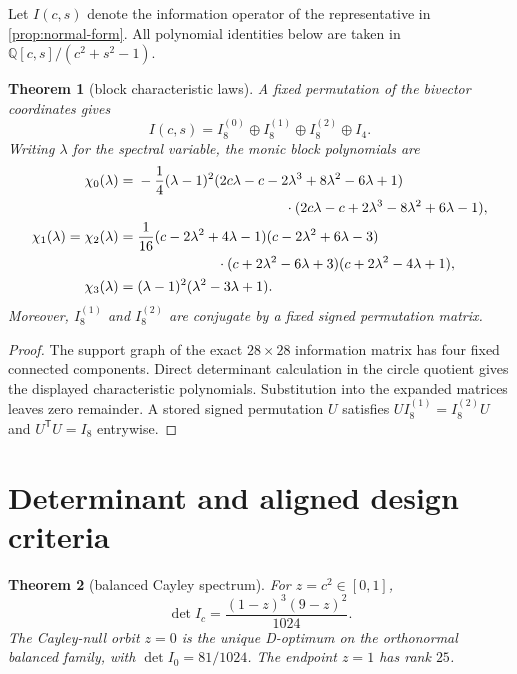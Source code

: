 \documentclass[11pt]{amsart}
\newtheorem{theorem}{Theorem}[section]
\theoremstyle{remark}
\begin{document}
Let $I(c,s)$ denote the information operator of the representative in
\cref{prop:normal-form}.  All polynomial identities below are taken in
\(\mathbb Q[c,s]/(c^2+s^2-1)\).

\begin{theorem}[block characteristic laws]\label{thm:blocks}
A fixed permutation of the bivector coordinates gives
\[
 I(c,s)=I_8^{(0)}\oplus I_8^{(1)}\oplus I_8^{(2)}\oplus I_4.
\]
Writing $\lambda$ for the spectral variable, the monic block polynomials are
\begin{align*}
\chi_0(\lambda)
={}&-\frac14(\lambda-1)^2
 (2c\lambda-c-2\lambda^3+8\lambda^2-6\lambda+1)\\
&\hspace{37mm}\cdot
 (2c\lambda-c+2\lambda^3-8\lambda^2+6\lambda-1),\\
\chi_1(\lambda)=\chi_2(\lambda)
={}&\frac1{16}(c-2\lambda^2+4\lambda-1)
 (c-2\lambda^2+6\lambda-3)\\
&\hspace{20mm}\cdot(c+2\lambda^2-6\lambda+3)
 (c+2\lambda^2-4\lambda+1),\\
\chi_3(\lambda)={}&(\lambda-1)^2(\lambda^2-3\lambda+1).
\end{align*}
Moreover, $I_8^{(1)}$ and $I_8^{(2)}$ are conjugate by a fixed signed
permutation matrix.
\end{theorem}

\begin{proof}
The support graph of the exact $28\times28$ information matrix has four fixed
connected components.  Direct determinant calculation in the circle quotient
gives the displayed characteristic polynomials.  Substitution into the
expanded matrices leaves zero remainder.  A stored signed permutation $U$
satisfies $UI_8^{(1)}=I_8^{(2)}U$ and $U^{\mathsf T}U=I_8$ entrywise.
\end{proof}

\section{Determinant and aligned design criteria}

\begin{theorem}[balanced Cayley spectrum]\label{thm:main}
For $z=c^2\in[0,1]$,
\[
 \det I_c=\frac{(1-z)^3(9-z)^2}{1024}.
\]
The Cayley-null orbit $z=0$ is the unique D-optimum on the orthonormal balanced
family, with $\det I_0=81/1024$.  The endpoint $z=1$ has rank $25$.
\end{theorem}
\end{document}
